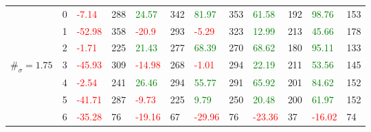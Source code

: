 \begin{table}[!htb]
\begin{adjustwidth}{-0.8in}{-0.9in}
\begin{tabular}{|p{4em}|p{2em}|p{3em}|p{3em}|p{3em}|p{3em}|p{3em}|p{3em}|p{3em}|p{3em}|p{3em}|p{3em}|}
            & 0 & \textcolor{red}{-7.14} & 288 & \textcolor{green}{24.57} & 342 & \textcolor{green}{81.97} & 353 & \textcolor{green}{61.58} & 192 & \textcolor{green}{98.76} & 153\\\cline{3-12}
            & 1 & \textcolor{red}{-52.98} & 358 & \textcolor{red}{-20.9} & 293 & \textcolor{red}{-5.29} & 323 & \textcolor{green}{12.99} & 213 & \textcolor{green}{45.66} & 178\\\cline{3-12}
            & 2 & \textcolor{red}{-1.71} & 225 & \textcolor{green}{21.43} & 277 & \textcolor{green}{68.39} & 270 & \textcolor{green}{68.62} & 180 & \textcolor{green}{95.11} & 133\\\cline{3-12}
            $\#_{\sigma}=1.75$ & 3 & \textcolor{red}{-45.93} & 309 & \textcolor{red}{-14.98} & 268 & \textcolor{red}{-1.01} & 294 & \textcolor{green}{22.19} & 211 & \textcolor{green}{53.56} & 145\\[-3ex]\cline{3-12}
            & 4 & \textcolor{red}{-2.54} & 241 & \textcolor{green}{26.46} & 294 & \textcolor{green}{55.77} & 291 & \textcolor{green}{65.92} & 201 & \textcolor{green}{84.62} & 152\\\cline{3-12}
            & 5 & \textcolor{red}{-41.71} & 287 & \textcolor{red}{-9.73} & 225 & \textcolor{green}{9.79} & 250 & \textcolor{green}{20.48} & 200 & \textcolor{green}{61.97} & 152\\\cline{3-12}
            & 6 & \textcolor{red}{-35.28} & 76 & \textcolor{red}{-19.16} & 67 & \textcolor{red}{-29.96} & 76 & \textcolor{red}{-23.36} & 37 & \textcolor{red}{-16.02} & 74\\\hline\hline
            

\end{tabular}
\end{adjustwidth}
\end{table}
